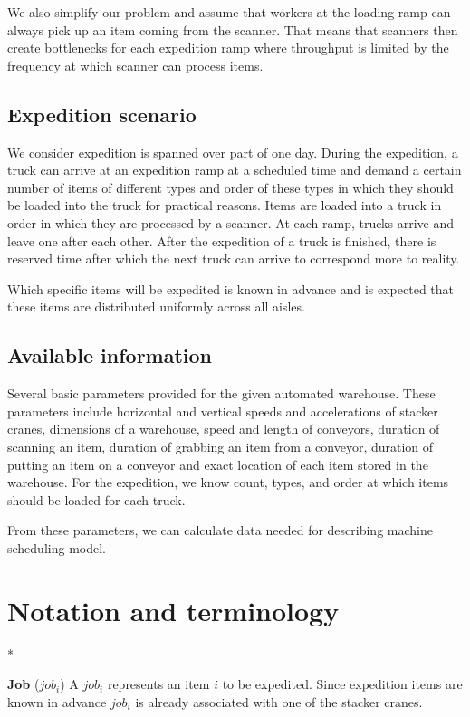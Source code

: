 \documentclass{ctuthesis}
\begin{document}
We also simplify our problem and assume that workers at the loading ramp can always pick up an item coming from the scanner. That means that scanners then create bottlenecks for each expedition ramp where throughput is limited by the frequency at which scanner can process items.

\subsection{Expedition scenario}

We consider expedition is spanned over part of one day. During the expedition, a truck can arrive at an expedition ramp at a scheduled time and demand a certain number of items of different types and order of these types in which they should be loaded into the truck for practical reasons. Items are loaded into a truck in order in which they are processed by a scanner. At each ramp, trucks arrive and leave one after each other. After the expedition of a truck is finished, there is reserved time after which the next truck can arrive to correspond more to reality. 

Which specific items will be expedited is known in advance and is expected that these items are distributed uniformly across all aisles.

\subsection{Available information}

Several basic parameters provided for the given automated warehouse. These parameters include horizontal and vertical speeds and accelerations of stacker cranes, dimensions of a warehouse, speed and length of conveyors, duration of scanning an item, duration of grabbing an item from a conveyor, duration of putting an item on a conveyor and exact location of each item stored in the warehouse. For the expedition, we know count, types, and order at which items should be loaded for each truck. 

From these parameters, we can calculate data needed for describing machine scheduling model.

\section{Notation and terminology}*

\noindent \textbf{Job} ($job_i$) A $job_i$ represents an item $i$ to be expedited. Since expedition items are known in advance $job_i$ is already associated with one of the stacker cranes. 
\end{document}
